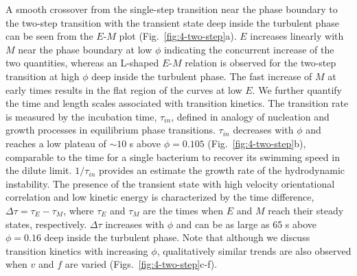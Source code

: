 A smooth crossover from the single-step transition near the phase boundary to the two-step transition with the transient state deep inside the turbulent phase can be seen from the $E$-$M$ plot (Fig.~\ref{fig:4-two-step}a).
$E$ increases linearly with $M$ near the phase boundary at low $\phi$ indicating the concurrent increase of the two quantities, whereas an L-shaped $E$-$M$ relation is observed for the two-step transition at high $\phi$ deep inside the turbulent phase.
The fast increase of $M$ at early times results in the flat region of the curves at low $E$. We further quantify the time and length scales associated with transition kinetics.
The transition rate is measured by the incubation time, $\tau_{in}$, defined in analogy of nucleation and growth processes in equilibrium phase transitions. $\tau_{in}$ decreases with $\phi$ and reaches a low plateau of $\sim 10$ s above $\phi = 0.105$ (Fig.~\ref{fig:4-two-step}b), comparable to the time for a single bacterium to recover its swimming speed in the dilute limit.
$1/\tau_{in}$ provides an estimate the growth rate of the hydrodynamic instability.
The presence of the transient state with high velocity orientational correlation and low kinetic energy is characterized by the time difference, $\Delta\tau = \tau_E-\tau_M$, where $\tau_E$ and $\tau_M$ are the times when $E$ and $M$ reach their steady states, respectively.
$\Delta\tau$ increases with $\phi$ and can be as large as 65 s above $\phi = 0.16$ deep inside the turbulent phase.
Note that although we discuss transition kinetics with increasing $\phi$, qualitatively similar trends are also observed when $v$ and $f$ are varied (Figs.~\ref{fig:4-two-step}c-f).


